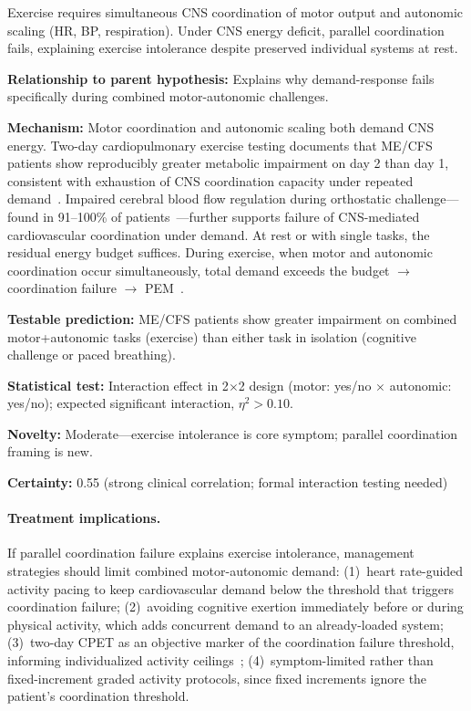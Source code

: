 \begin{hypothesis}
\label{hyp:motor-autonomic-overload}
Exercise requires simultaneous CNS coordination of motor output and autonomic scaling (HR, BP, respiration). Under CNS energy deficit, parallel coordination fails, explaining exercise intolerance despite preserved individual systems at rest.

\textbf{Relationship to parent hypothesis:} Explains why demand-response fails specifically during combined motor-autonomic challenges.

\textbf{Mechanism:} Motor coordination and autonomic scaling both demand CNS energy. Two-day cardiopulmonary exercise testing documents that ME/CFS patients show reproducibly greater metabolic impairment on day 2 than day 1, consistent with exhaustion of CNS coordination capacity under repeated demand~\cite{keller2024cpet}. Impaired cerebral blood flow regulation during orthostatic challenge---found in 91--100\% of patients~\cite{VanCampenEtAl2020}---further supports failure of CNS-mediated cardiovascular coordination under demand. At rest or with single tasks, the residual energy budget suffices. During exercise, when motor and autonomic coordination occur simultaneously, total demand exceeds the budget $\to$ coordination failure $\to$ PEM~\cite{walitt2024deep}.

\textbf{Testable prediction:} ME/CFS patients show greater impairment on combined motor+autonomic tasks (exercise) than either task in isolation (cognitive challenge or paced breathing).

\textbf{Statistical test:} Interaction effect in 2$\times$2 design (motor: yes/no $\times$ autonomic: yes/no); expected significant interaction, $\eta^2 > 0.10$.

\textbf{Novelty:} Moderate---exercise intolerance is core symptom; parallel coordination framing is new.

\textbf{Certainty:} 0.55 (strong clinical correlation; formal interaction testing needed)

\paragraph{Treatment implications.}
If parallel coordination failure explains exercise intolerance, management strategies should limit combined motor-autonomic demand: (1)~heart rate-guided activity pacing to keep cardiovascular demand below the threshold that triggers coordination failure; (2)~avoiding cognitive exertion immediately before or during physical activity, which adds concurrent demand to an already-loaded system; (3)~two-day CPET as an objective marker of the coordination failure threshold, informing individualized activity ceilings~\cite{keller2024cpet}; (4)~symptom-limited rather than fixed-increment graded activity protocols, since fixed increments ignore the patient's coordination threshold.


\end{hypothesis}
